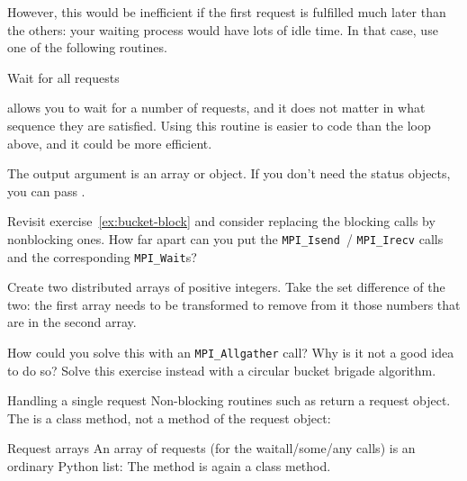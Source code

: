 However, this would be inefficient if the first request is fulfilled
much later than the others: your waiting process would have lots of
idle time. In that case, use one of the following routines.

 {Wait for all requests}
  
 allows you to wait for a number of
requests, and it does not matter in what sequence they are
satisfied. Using this routine is easier to code than the loop above,
and it could be more efficient.
%

The output argument is an array or  object.
If you don't need the status objects, you can pass
.

\begin{exercise}
  \label{ex:bucket-nonblock}
  Revisit exercise~\ref{ex:bucket-block} and consider replacing the
  blocking calls by nonblocking ones. How far apart can you put the
  \lstinline{MPI_Isend}~/ \lstinline{MPI_Irecv} calls and the
  corresponding \lstinline{MPI_Wait}s?
\end{exercise}

\begin{exercise}
  \label{ex:setdiff}
  Create two distributed arrays of positive integers.
  Take the set difference of the two:
  the first array needs to be transformed to remove from it those numbers
  that are in the second array.

  How could you solve this with an \lstinline+MPI_Allgather+ call?
  Why is it not a good idea to do so?
  Solve this exercise instead with a circular bucket brigade algorithm.
\end{exercise}

\begin{pythonnote}{Handling a single request}
  Non-blocking routines such as 
  return a request object.
  The  is a class method,
  not a method of the request object:
\end{pythonnote}

\begin{pythonnote}{Request arrays}
  An array of requests (for the waitall/some/any calls)
  is an ordinary Python list:
  The  method is again a class method.
\end{pythonnote}

